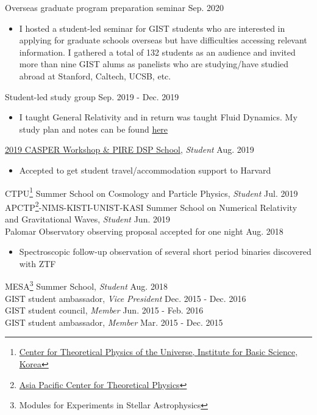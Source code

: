 \documentclass[margin, 10pt]{res} %
\begin{document}
\begin{resume}
Overseas graduate program preparation seminar \hfill Sep. 2020
\begin{itemize}
    \item[]  I hosted a student-led seminar for GIST students who are interested in applying for graduate schools overseas but have difficulties accessing relevant information. I gathered a total of 132 students as an audience and invited more than nine GIST alums as panelists who are studying/have studied abroad at Stanford, Caltech, UCSB, etc.
\end{itemize}
Student-led study group \hfill Sep. 2019 - Dec. 2019
\begin{itemize}
    \item[] I taught General Relativity and in return was taught Fluid Dynamics. My study plan and notes can be found \href{https://docs.google.com/spreadsheets/d/148MdZeH7q8QX9hl4hwpG867U84EG6tA_QnvUUvUCtcQ/edit?usp=sharing}{here}
\end{itemize}
\href{https://www.cfa.harvard.edu/events/2019/casper/index.html}{2019 CASPER Workshop \& PIRE DSP School}, {\sl Student} \hfill Aug. 2019
\begin{itemize}
\item[] Accepted to get student travel/accommodation support to Harvard
\end{itemize}
CTPU\footnote{\href{https://ctpu.ibs.re.kr/html/ctpu_en/}{Center for Theoretical Physics of the Universe, Institute for Basic Science, Korea}}  Summer School on Cosmology and Particle Physics, {\sl Student} \hfill Jul. 2019 \\
APCTP\footnote{\href{https://www.apctp.org/main/}{Asia Pacific Center for Theoretical Physics}}-NIMS-KISTI-UNIST-KASI Summer School on Numerical Relativity and Gravitational Waves, {\sl Student} \hfill Jun. 2019 \\
Palomar Observatory observing proposal accepted for one night \hfill Aug. 2018
\begin{itemize}
\item[] Spectroscopic follow-up observation of several short period binaries discovered with ZTF
\end{itemize}
MESA\footnote{Modules for Experiments in Stellar Astrophysics} Summer School, {\sl Student} \hfill Aug. 2018 \\
GIST student ambassador, {\sl Vice President} \hfill Dec. 2015 - Dec. 2016 \\
GIST student council, {\sl Member} \hfill Jun. 2015 - Feb. 2016\\
GIST student ambassador, {\sl Member} \hfill Mar. 2015 - Dec. 2015\\



\end{resume}
\end{document}
